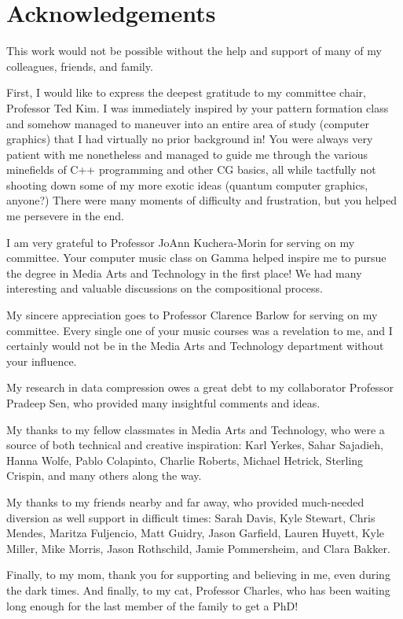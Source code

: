 \chapter*{Acknowledgements}

{\singlespace
This work would not be possible without the help and support of many of my colleagues, friends, and family.

First, I would like to express the deepest gratitude to my committee chair, Professor Ted Kim. I was immediately inspired by your pattern formation class and somehow managed to maneuver into an entire area of study (computer graphics) that I had virtually no prior background in! You were always very patient with me nonetheless and managed to guide me through the various minefields of C++ programming and other CG basics, all while tactfully not shooting down some of my more exotic ideas (quantum computer graphics, anyone?) There were many moments of difficulty and frustration, but you helped me persevere in the end.

I am very grateful to Professor JoAnn Kuchera-Morin for serving on my committee. Your computer music class on Gamma helped inspire me to pursue the degree in Media Arts and Technology in the first place! We had many interesting and valuable discussions on the compositional process. 

My sincere appreciation goes to Professor Clarence Barlow for serving on my committee. Every single one of your music courses was a revelation to me, and I certainly would not be in the Media Arts and Technology department without your influence. 

My research in data compression owes a great debt to my collaborator Professor Pradeep Sen, who provided many insightful comments and ideas.

My thanks to my fellow classmates in Media Arts and Technology, who were a source of both technical and creative inspiration: Karl Yerkes, Sahar Sajadieh, Hanna Wolfe, Pablo Colapinto, Charlie Roberts, Michael Hetrick, Sterling Crispin, and many others along the way.

My thanks to my friends nearby and far away, who provided much-needed diversion as well support in difficult times: Sarah Davis, Kyle Stewart, Chris Mendes, Maritza Fuljencio, Matt Guidry, Jason Garfield, Lauren Huyett, Kyle Miller, Mike Morris, 
Jason Rothschild, Jamie Pommersheim, and Clara Bakker.

Finally, to my mom, thank you for supporting and believing in me, even during the dark times. And finally, to my cat, Professor Charles, who has been waiting long enough for the last member of the family to get a PhD!
}

